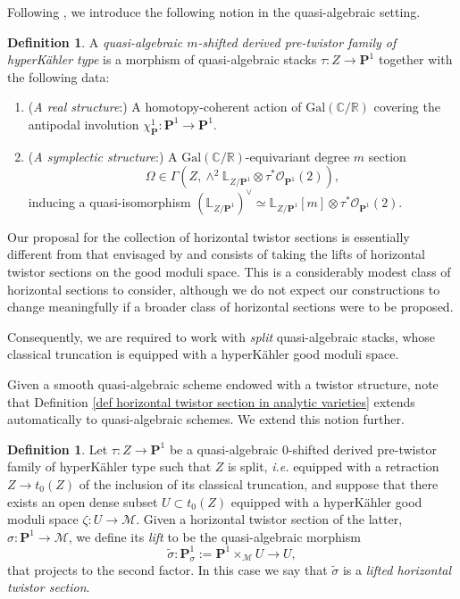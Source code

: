 \documentclass[11pt, a4paper]{amsart}
\numberwithin{equation}{section}
\theoremstyle{definition}
\newtheorem{definition}[theorem]{Definition}
\theoremstyle{remark}
\newcommand{\Mm}{\mathcal{M}}
\newcommand{\Oo}{\mathcal{O}}
\renewcommand{\P}{\mathbf{P}}
\newcommand{\wt}[1]{\widetilde{#1}}
\newcommand{\CC}{\mathbb{C}}
\newcommand{\RR}{\mathbb{R}}
\newcommand{\LL}{\mathbb{L}}
\renewcommand{\to}{\longrightarrow}
\begin{document}
Following \cite{KPS, kryczka&tannaka&yau}, we introduce the following notion in the quasi-algebraic setting.

\begin{definition}
A {\it quasi-algebraic $m$-shifted derived pre-twistor family of hyperKähler type} is a morphism of quasi-algebraic stacks $\tau : Z \to \P^1$ together with the following data:
\begin{enumerate}
\item ({\it A real structure}:) A homotopy-coherent action of $\mathrm{Gal}(\CC/\RR)$ covering the antipodal involution $\chi_\P^1 : \P^1 \to \P^1$.

\item ({\it A symplectic structure}:) A $\mathrm{Gal}(\CC/\RR)$-equivariant degree $m$ section
\[
\Omega \in \Gamma\!\left( Z, \wedge^2 \LL_{Z/\P^1} \otimes\tau^*\Oo_{\P^1}(2) \right),
\]
inducing a quasi-isomorphism $(\LL_{Z/\P^1})^\vee
\simeq \LL_{Z/\P^1}[m] \otimes \tau^*\Oo_{\P^1}(2)$.
\end{enumerate}
\end{definition}


Our proposal for the collection of horizontal twistor sections is essentially different from that envisaged by \cite{KPS, kryczka&tannaka&yau} and consists of taking the lifts of horizontal twistor sections on the good moduli space. This is a considerably modest class of horizontal sections to consider, although we do not expect our constructions to change meaningfully if a broader class of horizontal sections were to be proposed.

Consequently, we are required to work with \textit{split} quasi-algebraic stacks, whose classical truncation is equipped with a hyperK\"ahler good moduli space. 

Given a smooth quasi-algebraic scheme endowed with a twistor structure, note that Definition \ref{def horizontal twistor section in analytic varieties} extends automatically to quasi-algebraic schemes. We extend this notion further.

\begin{definition} \label{def lifted horizontal lines}
Let $\tau : Z \to \P^1$ be a quasi-algebraic $0$-shifted derived pre-twistor family of hyperKähler type such that $Z$ is split, {\it i.e. } equipped with a retraction $Z \to t_{0}(Z)$ of the inclusion of its classical truncation, and suppose that there exists an open dense subset $U \subset t_0(Z)$ equipped with a hyperK\"ahler good moduli space $\zeta : U \to \Mm$. Given a horizontal twistor section of the latter, $\sigma : \P^1 \to \Mm$, we define its {\it lift} to be the quasi-algebraic morphism
\[
\wt \sigma : \P^1_\sigma := \P^1 \times_{\Mm} U \to U,
\]
that projects to the second factor. In this case we say that $\wt \sigma$ is a {\it lifted horizontal twistor section}.
\end{definition}
\end{document}
